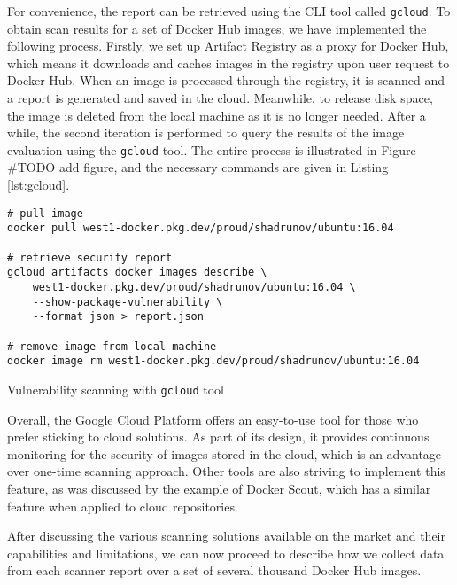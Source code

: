 For convenience, the report can be retrieved using the CLI tool called \texttt{gcloud}. To obtain scan results for a set of Docker Hub images, we have implemented the following process. Firstly, we set up Artifact Registry as a proxy for Docker Hub, which means it downloads and caches images in the registry upon user request to Docker Hub. When an image is processed through the registry, it is scanned and a report is generated and saved in the cloud. Meanwhile, to release disk space, the image is deleted from the local machine as it is no longer needed. After a while, the second iteration is performed to query the results of the image evaluation using the \texttt{gcloud} tool. The entire process is illustrated in Figure \#TODO add figure, and the necessary commands are given in Listing \ref{lst:gcloud}.

\begin{listing}[htp]
    \centering
    \begin{minipage}{0.85\linewidth}
        \begin{verbatim}
# pull image
docker pull west1-docker.pkg.dev/proud/shadrunov/ubuntu:16.04

# retrieve security report
gcloud artifacts docker images describe \
    west1-docker.pkg.dev/proud/shadrunov/ubuntu:16.04 \
    --show-package-vulnerability \
    --format json > report.json

# remove image from local machine
docker image rm west1-docker.pkg.dev/proud/shadrunov/ubuntu:16.04
        \end{verbatim}
    \end{minipage}
    \caption{Vulnerability scanning with \texttt{gcloud} tool}
    \label{lst:gcloud}
\end{listing}

Overall, the Google Cloud Platform offers an easy-to-use tool for those who prefer sticking to cloud solutions. As part of its design, it provides continuous monitoring for the security of images stored in the cloud, which is an advantage over one-time scanning approach. Other tools are also striving to implement this feature, as was discussed by the example of Docker Scout, which has a similar feature when applied to cloud repositories.

After discussing the various scanning solutions available on the market and their capabilities and limitations, we can now proceed to describe how we collect data from each scanner report over a set of several thousand Docker Hub images.


